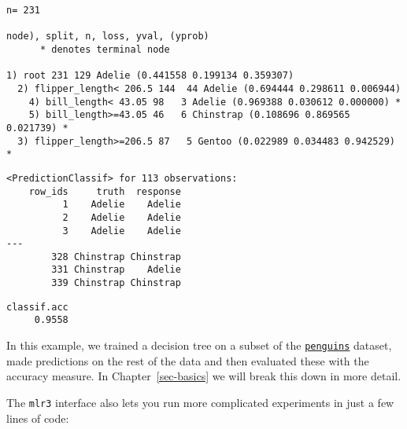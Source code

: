 \begin{verbatim}
n= 231 

node), split, n, loss, yval, (yprob)
      * denotes terminal node

1) root 231 129 Adelie (0.441558 0.199134 0.359307)  
  2) flipper_length< 206.5 144  44 Adelie (0.694444 0.298611 0.006944)  
    4) bill_length< 43.05 98   3 Adelie (0.969388 0.030612 0.000000) *
    5) bill_length>=43.05 46   6 Chinstrap (0.108696 0.869565 0.021739) *
  3) flipper_length>=206.5 87   5 Gentoo (0.022989 0.034483 0.942529) *
\end{verbatim}

\begin{Shaded}
\begin{Highlighting}[]
\OtherTok{=}\SpecialCharTok{$}\SpecialCharTok{$}
\end{Highlighting}
\end{Shaded}

\begin{verbatim}
<PredictionClassif> for 113 observations:
    row_ids     truth  response
          1    Adelie    Adelie
          2    Adelie    Adelie
          3    Adelie    Adelie
---                            
        328 Chinstrap Chinstrap
        331 Chinstrap    Adelie
        339 Chinstrap Chinstrap
\end{verbatim}

\begin{Shaded}
\begin{Highlighting}[]
\SpecialCharTok{$}\NormalTok{(}\NormalTok{(}\NormalTok{))}
\end{Highlighting}
\end{Shaded}

\begin{verbatim}
classif.acc 
     0.9558 
\end{verbatim}

In this example, we trained a decision tree on a subset of the
\href{https://www.rdocumentation.org/packages/palmerpenguins/topics/penguins}{\texttt{penguins}}
dataset, made predictions on the rest of the data and then evaluated
these with the accuracy measure. In Chapter~\ref{sec-basics} we will
break this down in more detail.

The \texttt{mlr3} interface also lets you run more complicated
experiments in just a few lines of code:

